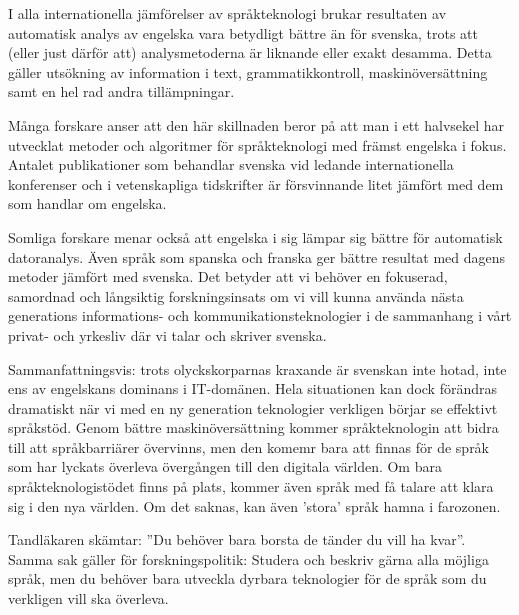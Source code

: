 \begin{multicols}{2}
I alla internationella jämförelser av språkteknologi brukar resultaten
av automatisk analys av engelska vara betydligt bättre än för svenska,
trots att (\mbox{eller} just därför att) analysmetoderna är liknande eller
\mbox{exakt} desamma. Detta gäller utsökning av information i text,
grammatikkontroll, maskin\-över\-sätt\-ning samt en hel rad andra
tillämpningar.

Många forskare anser att den här skillnaden beror på att man i ett
halvsekel har utvecklat metoder och algo\-ritmer för språkteknologi med
främst engelska i fokus. Antalet publikationer som behandlar svenska
vid ledande internationella konferenser och i vetenskapliga
tidskrifter är försvinnande litet jämfört med dem som handlar om
engelska.

Somliga forskare menar också att engelska i sig lämpar sig bättre för
automatisk datoranalys. Även språk som spanska och franska ger bättre
resultat med \mbox{dagens} metoder jämfört med svenska. Det betyder att vi
behöver en fokuserad, samordnad och lång\-siktig forskningsinsats om vi
vill kunna an\-vända nästa generations informations- och
kommunikationsteknologier i de sammanhang i vårt privat- och yrkesliv
där vi talar och skriver svenska.

Sammanfattningsvis: trots olyckskorparnas krax\-ande är svenskan inte
hotad, inte ens av engelskans dominans i IT-domänen. Hela situationen
kan dock förändras dramatiskt när vi med en ny generation teknologier
verkligen börjar se effektivt språkstöd. Genom bättre
maskin\-över\-sätt\-ning kommer språkteknologin att bidra till att
språkbarriärer övervinns, men den komemr bara att finnas för de språk
som har lyckats överleva övergången till den digitala värld\-en. Om bara
språkteknologistödet finns på plats, kommer även språk med få talare
att klara sig i den nya världen. Om det saknas, kan även 'stora' språk
hamna i farozonen.

Tandläkaren skämtar: ''Du behöver bara borsta de tänder du vill ha
kvar''. Samma sak gäller för forskningspolitik: \mbox{Studera} och
beskriv gärna alla möjliga språk, men du behöver bara utveckla dyrbara
teknologier för de språk som du verkligen vill ska överleva.


\end{multicols}

\clearpage


